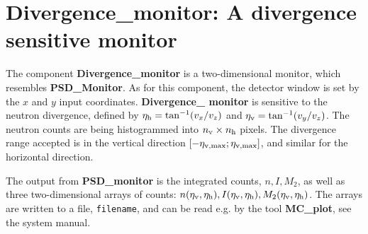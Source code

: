 
\section{Divergence\_monitor: A divergence sensitive monitor}
\label{s:div-monitor}


The component {\bf Divergence\_monitor} is a two-dimensional monitor,
which resembles {\bf PSD\_Monitor}. As for this component,
the detector window is set
by the $x$ and $y$ input coordinates.
{\bf Divergence\_ monitor} is sensitive to the neutron divergence,
defined by
$\eta_{\rm h} = \tan^{-1}(v_x/v_z)$ and $\eta_{\rm v} = \tan^{-1}(v_y/v_z)$.
The neutron counts are being histogrammed
into $n_{\rm v} \times n_{\rm h}$ pixels. 
The divergence range accepted is in the vertical direction
$[-\eta_{\rm v,max}; \eta_{\rm v,max}]$, and similar for the horizontal
direction.

The output from {\bf PSD\_monitor} is the integrated counts, $n, I, M_2$,
as well as
three two-dimensional arrays of counts: $n(\eta_{\rm v},\eta_{\rm h}),
I(\eta_{\rm v},\eta_{\rm h}), M_2(\eta_{\rm v},\eta_{\rm h})$.
The arrays are written to a file, \verb+filename+, 
and can be read e.g. by the tool {\bf MC\_plot}, see the system manual.

